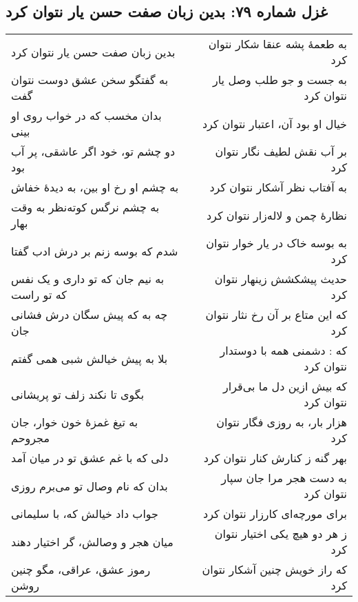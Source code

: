 \begin{center}
\section*{غزل شماره ۷۹: بدین زبان صفت حسن یار نتوان کرد}
\label{sec:079}
\begin{longtable}{l p{0.5cm} r}
بدین زبان صفت حسن یار نتوان کرد
&&
به طعمهٔ پشه عنقا شکار نتوان کرد
\\
به گفتگو سخن عشق دوست نتوان گفت
&&
به جست و جو طلب وصل یار نتوان کرد
\\
بدان مخسب که در خواب روی او بینی
&&
خیال او بود آن، اعتبار نتوان کرد
\\
دو چشم تو، خود اگر عاشقی، پر آب بود
&&
بر آب نقش لطیف نگار نتوان کرد
\\
به چشم او رخ او بین، به دیدهٔ خفاش
&&
به آفتاب نظر آشکار نتوان کرد
\\
به چشم نرگس کوته‌نظر به وقت بهار
&&
نظارهٔ چمن و لاله‌زار نتوان کرد
\\
شدم که بوسه زنم بر درش ادب گفتا
&&
به بوسه خاک در یار خوار نتوان کرد
\\
به نیم جان که تو داری و یک نفس که تو راست
&&
حدیث پیشکشش زینهار نتوان کرد
\\
چه به که پیش سگان درش فشانی جان
&&
که این متاع بر آن رخ نثار نتوان کرد
\\
بلا به پیش خیالش شبی همی گفتم
&&
که : دشمنی همه با دوستدار نتوان کرد
\\
بگوی تا نکند زلف تو پریشانی
&&
که بیش ازین دل ما بی‌قرار نتوان کرد
\\
به تیغ غمزهٔ خون خوار، جان مجروحم
&&
هزار بار، به روزی فگار نتوان کرد
\\
دلی که با غم عشق تو در میان آمد
&&
بهر گنه ز کنارش کنار نتوان کرد
\\
بدان که نام وصال تو می‌برم روزی
&&
به دست هجر مرا جان سپار نتوان کرد
\\
جواب داد خیالش که، با سلیمانی
&&
برای مورچه‌ای کارزار نتوان کرد
\\
میان هجر و وصالش، گر اختیار دهند
&&
ز هر دو هیچ یکی اختیار نتوان کرد
\\
رموز عشق، عراقی، مگو چنین روشن
&&
که راز خویش چنین آشکار نتوان کرد
\\
\end{longtable}
\end{center}
